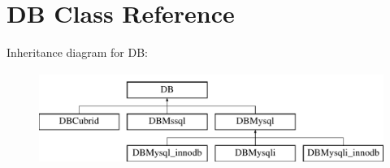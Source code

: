 \hypertarget{classDB}{}\section{DB Class Reference}
\label{classDB}
Inheritance diagram for DB\+:\begin{figure}[H]
\begin{center}
\leavevmode
\includegraphics[height=3.000000cm]{classDB}
\end{center}
\end{figure}
